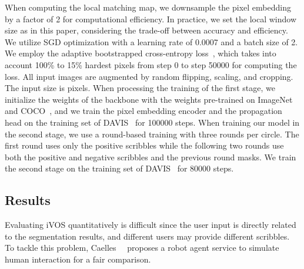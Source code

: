 \documentclass[10pt,twocolumn,letterpaper]{article}
\begin{document}
When computing the local matching map, we downsample the pixel embedding by a factor of 2 for computational efficiency. In practice, we set the local window size as  in this paper, considering the trade-off between accuracy and efficiency. We utilize SGD optimization with a learning rate of 0.0007 and a batch size of 2. We employ the adaptive bootstrapped cross-entropy loss~\cite{pohlen2017full}, which takes into account 100\% to 15\% hardest pixels from step 0 to step 50000 for computing the loss. All input images are augmented by random flipping, scaling, and cropping. The input size is  pixels. When processing the training of the first stage, we initialize the weights of the backbone with the weights pre-trained on ImageNet~\cite{deng2009imagenet} and COCO~\cite{lin2014microsoft}, and we train the pixel embedding encoder and the propagation head on the training set of DAVIS~\cite{pont20172017} for 100000 steps. When training our model in the second stage, we use a round-based training with three rounds per circle. The first round uses only the positive scribbles while the following two rounds use both the positive and negative scribbles and the previous round masks. We train the second stage on the training set of DAVIS~\cite{pont20172017} for 80000 steps.



\subsection{Results}
Evaluating iVOS quantitatively is difficult since the user input is directly related to the segmentation results, and different users may provide different scribbles. To tackle this problem, Caelles~\etal~\cite{caelles20182018} proposes a robot agent service to simulate human interaction for a fair comparison.
\end{document}
